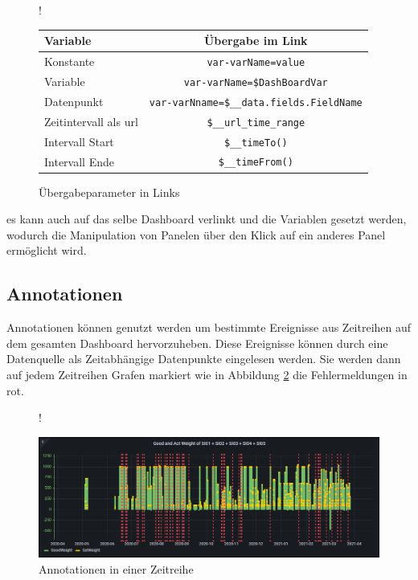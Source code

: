 \documentclass[a4paper, 12pt, oneside]{scrbook}
\begin{document}
		\begin{figure} [H]
			\centering
			\resizebox{\linewidth} {!} {
	 		\begin{tabular}[h]{|l|c|}
	 			\hline
	 			Variable & Übergabe im Link \\
	 			\hline
	 			Konstante & \texttt{var-varName=value} \\
	 			\hline
	 			Variable &  \texttt{var-varName=\${DashBoardVar}} \\
	 			\hline
	 			Datenpunkt &  \texttt{var-varNname=\${\_\_data.fields.FieldName}} \\
	 			\hline
	 			Zeitintervall als url &  \texttt{\${\_\_url\_time\_range}} \\
	 			Intervall Start& \texttt{\$\_\_timeTo()} \\
	 			Intervall Ende& \texttt{\$\_\_timeFrom()} \\
	 			\hline
	 		\end{tabular}
		}
		 		
	 	\caption{Übergabeparameter in Links}
	 	\label{tab:links}
	\end{figure}
		 
	\noindent es kann auch auf das selbe Dashboard verlinkt und die Variablen gesetzt werden, wodurch die Manipulation von Panelen über den Klick auf ein anderes Panel ermöglicht wird.
			 
			 
	\subsection{Annotationen}
			 
	\noindent Annotationen können genutzt werden um bestimmte Ereignisse aus Zeitreihen auf dem gesamten Dashboard hervorzuheben. Diese Ereignisse können durch eine Datenquelle als Zeitabhängige Datenpunkte eingelesen werden. Sie werden dann auf jedem Zeitreihen Grafen markiert wie in Abbildung \ref{fig:annotations} die Fehlermeldungen in rot.
		 
	\begin{figure} [H]
	 	\centering
	 	\resizebox{\linewidth} {!} {
	 		\includegraphics{res/annotaitons.png}
	 		
	 	}
	 	\caption{Annotationen in einer Zeitreihe}
	 	\label{fig:annotations}
	 \end{figure}
	 
\end{document}

